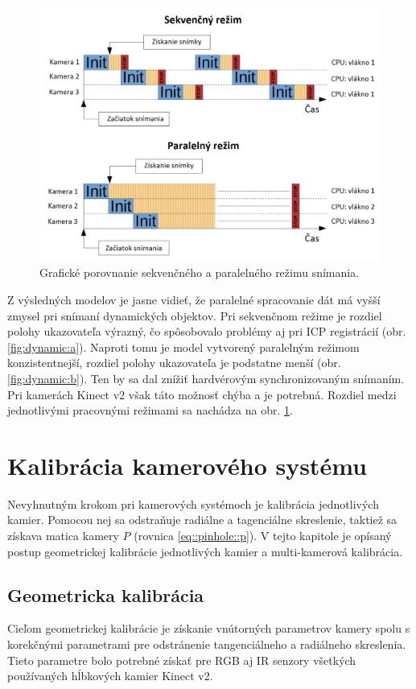 \begin{figure}[H]
	\centering
	\includegraphics[width=\textwidth]{figures/scanning_mode.png}
	\caption{Grafické porovnanie sekvenčného a paralelného režimu snímania.}
	\label{fig:parallel_sequence}
\end{figure}

Z výsledných modelov je jasne vidieť, že paralelné spracovanie dát má vyšší zmysel pri snímaní dynamických objektov. Pri sekvenčnom režime je rozdiel polohy ukazovateľa výrazný, čo spôsobovalo problémy aj pri ICP registrácií (obr. \ref{fig:dynamic:a}). Naproti tomu je model vytvorený paralelným režimom konzistentnejší, rozdiel polohy ukazovateľa je podstatne menší (obr. \ref{fig:dynamic:b}). Ten by sa dal znížiť hardvérovým synchronizovaným snímaním. Pri kamerách Kinect v2 však táto možnosť chýba a je potrebná. Rozdiel medzi jednotlivými pracovnými režimami sa nachádza na obr. \ref{fig:parallel_sequence}. 

\section{Kalibrácia kamerového systému}
\label{sec:kinect_calib}

Nevyhnutným krokom pri kamerových systémoch je kalibrácia jednotlivých kamier. Pomocou nej sa odstraňuje radiálne a tagenciálne skreslenie, taktiež sa získava matica kamery $P$ (rovnica \ref{eq::pinhole::p}). V tejto kapitole je opísaný postup geometrickej kalibrácie jednotlivých kamier a multi-kamerová kalibrácia. 

\subsection{Geometricka kalibrácia}
Cieľom geometrickej kalibrácie je získanie vnútorných parametrov  kamery spolu s korekčnými parametrami pre odstránenie tangenciálneho a radiálneho skreslenia. Tieto parametre bolo potrebné získať pre RGB aj IR senzory všetkých používaných hĺbkových kamier Kinect v2. 


